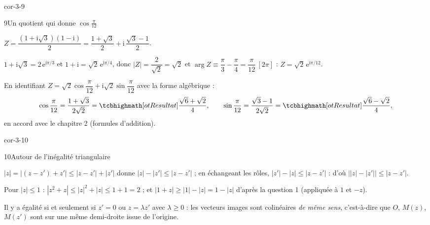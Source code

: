 \begin{blocLivre}{cor-3-9}
\begin{corrige}{9}{Un quotient qui donne $\cos\frac{\pi}{12}$}
\begin{questions}
  \item $Z=\dfrac{(1+\mathrm{i}\sqrt3)(1-\mathrm{i})}{2}
    =\dfrac{1+\sqrt3}{2}+\mathrm{i}\,\dfrac{\sqrt3-1}{2}$.
  \item $1+\mathrm{i}\sqrt3=2\,\mathrm{e}^{\mathrm{i}\pi/3}$ et
    $1+\mathrm{i}=\sqrt2\,\mathrm{e}^{\mathrm{i}\pi/4}$, donc
    $|Z|=\dfrac{2}{\sqrt2}=\sqrt2$ et
    $\arg Z\equiv\dfrac{\pi}{3}-\dfrac{\pi}{4}=\dfrac{\pi}{12}\ [2\pi]$ :
    $Z=\sqrt2\,\mathrm{e}^{\mathrm{i}\pi/12}$.
  \item En identifiant $Z=\sqrt2\cos\dfrac{\pi}{12}+\mathrm{i}\sqrt2\sin\dfrac{\pi}{12}$
    avec la forme algébrique :
    \[
      \cos\frac{\pi}{12}=\frac{1+\sqrt3}{2\sqrt2}=\res{\frac{\sqrt6+\sqrt2}{4}},
      \qquad
      \sin\frac{\pi}{12}=\frac{\sqrt3-1}{2\sqrt2}=\res{\frac{\sqrt6-\sqrt2}{4}},
    \]
    en accord avec le chapitre 2 (formules d'addition).
\end{questions}
\end{corrige}
\end{blocLivre}

\begin{blocLivre}{cor-3-10}
\begin{corrige}{10}{Autour de l'inégalité triangulaire}
\begin{questions}
  \item $|z|=|(z-z')+z'|\leq|z-z'|+|z'|$ donne $|z|-|z'|\leq|z-z'|$ ; en
    échangeant les rôles, $|z'|-|z|\leq|z-z'|$ : d'où
    $\bigl||z|-|z'|\bigr|\leq|z-z'|$.
  \item Pour $|z|\leq1$ : $|z^{2}+z|\leq|z|^{2}+|z|\leq1+1=2$ ; et
    $|1+z|\geq|1|-|z|=1-|z|$ d'après la question 1 (appliquée à $1$ et $-z$).
  \item Il y a égalité si et seulement si $z'=0$ ou $z=\lambda z'$ avec
    $\lambda\geq0$ : les vecteurs images sont colinéaires \emph{de même
    sens}, c'est-à-dire que $O$, $M(z)$, $M(z')$ sont sur une même
    demi-droite issue de l'origine.
\end{questions}
\end{corrige}
\end{blocLivre}

